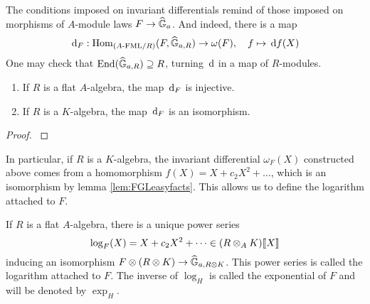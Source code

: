 The conditions imposed on invariant differentials remind of those imposed on 
morphisms of $A$-module laws $F \to \widehat{\mathbb{G}}_a$. And indeed, there is a map
\begin{equation} \label{eq:functorinvdifftohom}
  \, \mathrm{d}_F : \operatorname{Hom}_{{({A}\text-\mathrm{FML}/{R})}} (F, \widehat{\mathbb{G}}_{a,R}) \to \omega(F), \quad f \mapsto \, \mathrm{d} f(X)
\end{equation}
One may check that $\operatorname{End}(\widehat{\mathbb{G}}_{a,R}) \supseteq R$, turning $\, \mathrm{d}$ in a map of $R$-modules.
\begin{prop}
  \begin{enumerate}
    \item If $R$ is a flat $A$-algebra, the map $\, \mathrm{d}_F$ is injective.
    \item If $R$ is a $K$-algebra, the map $\, \mathrm{d}_F$ is an isomorphism.
  \end{enumerate}
\begin{proof}
  \cite[Chapter 3]{hopkins1994equivariant} 
\end{proof}
\end{prop}

In particular, if $R$ is a $K$-algebra, the invariant differential 
$\omega_F(X)$ constructed above comes from a homomorphism $f(X) = X + c_2 X^2 + \dots$,
which is an isomorphism by lemma \ref{lem:FGLeasyfacts}. 
This allows us to define the logarithm attached to $F$.
\begin{defi}
  If $R$ is a flat $A$-algebra, there is a unique power series
  \begin{equation*}
    \log_F(X) = X + c_2 X^2 + \dots \in (R \otimes_A K)\llbracket X \rrbracket 
  \end{equation*}
  inducing an isomorphism $F \otimes (R \otimes K) \to \widehat{\mathbb{G}}_{a,R\otimes K}$.
  This power series is called the logarithm attached to $F$. 
  The inverse of $\log_H$ is called the exponential of $F$ and will be denoted by
  $\exp_H$.
\end{defi}

